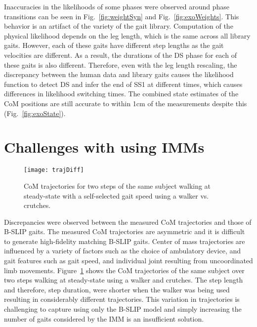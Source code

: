 Inaccuracies in the likelihoods of some phases were observed around phase transitions can be seen in Fig.~\ref{fig:weightSyn} and Fig.~\ref{fig:exoWeights}. This behavior is an artifact of the variety of the gait library. Computation of the physical likelihood depends on the leg length, which is the same across all library gaits. However, each of these gaits have different step lengths as the gait velocities are different. As a result, the durations of the DS phase for each of these gaits is also different. Therefore, even with the leg length rescaling, the discrepancy between the human data and library gaits causes the likelihood function to detect DS and infer the end of SS1 at different times, which causes differences in likelihood switching times. The combined state estimates of the CoM positions are still accurate to within 1cm of the measurements despite this (Fig.~\ref{fig:exoState}).

\section{Challenges with using IMMs}

\begin{figure}
	\centering
	\texttt{[image: trajDiff]}
	\caption{CoM trajectories for two steps of the same subject walking at steady-state with a self-selected gait speed using a walker vs. crutches.}\label{fig:trajDiff}
\end{figure}
Discrepancies were observed between the measured CoM trajectories and those of B-SLIP gaits. The measured CoM trajectories are asymmetric and it is difficult to generate high-fidelity matching B-SLIP gaits. Center of mass trajectories are influenced by a variety of factors such as the choice of ambulatory device, and gait features such as gait speed, and individual joint resulting from uncoordinated limb movements. Figure~\ref{fig:trajDiff} shows the CoM trajectories of the same subject over two steps walking at steady-state using a walker and crutches. The step length and therefore, step duration, were shorter when the walker was being used resulting in considerably different trajectories. This variation in trajectories is challenging to capture using only the B-SLIP model and simply increasing the number of gaits considered by the IMM is an insufficient solution.

